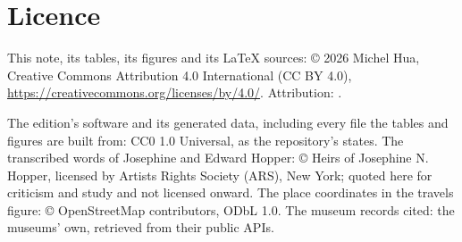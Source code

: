 \section*{Licence}

This note, its tables, its figures and its LaTeX sources: © 2026 Michel Hua, Creative Commons Attribution 4.0 International (CC BY 4.0), \url{https://creativecommons.org/licenses/by/4.0/}. Attribution: .

The edition's software and its generated data, including every file the tables and figures are built from: CC0 1.0 Universal, as the repository's  states. The transcribed words of Josephine and Edward Hopper: © Heirs of Josephine N. Hopper, licensed by Artists Rights Society (ARS), New York; quoted here for criticism and study and not licensed onward. The place coordinates in the travels figure: © OpenStreetMap contributors, ODbL 1.0. The museum records cited: the museums' own, retrieved from their public APIs.
\endgroup
